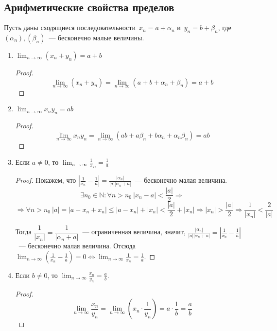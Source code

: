 \subsection{Арифметические свойства пределов}
Пусть даны сходящиеся последовательности~$x_n = a + \alpha_n$ и~$y_n = b + \beta_n$, где $(\alpha_n), (\beta_n)$~--- бесконечно малые величины.
\begin{enumerate}
	\item $\displaystyle \lim_{n \to \infty} (x_n + y_n) = a + b$
	\begin{proof}
	\begin{equation*}
	\lim_{n \to \infty} (x_n + y_n) = \lim_{n \to \infty} (a + b + \alpha_n + \beta_n) = a + b
	\end{equation*}
	\end{proof}
	
	\item $\displaystyle \lim_{n \to \infty} x_n y_n = ab$
	\begin{proof}
	\begin{equation*}
	\lim_{n \to \infty} x_n y_n = \lim_{n \to \infty} (ab + a\beta_n + b\alpha_n + \alpha_n \beta_n) = ab
	\end{equation*}
	\end{proof}
	
	\item Если $a \neq 0$, то $\displaystyle \lim_{n \to \infty} \frac1x_n = \frac1a$
	\begin{proof}
	Покажем, что $\displaystyle \left| \frac1{x_n} - \frac1a \right| = \frac{|\alpha_n|}{|a||\alpha_n + a|}$~--- бесконечно малая величина.
	\begin{equation*}
	\exists n_0 \in \mathbb N \colon \forall n > n_0 \ |x_n - a| < \frac{|a|}2 \Rightarrow
	\end{equation*}
	\begin{equation*}
	\Rightarrow \forall n > n_0 \ |a| = |a - x_n + x_n| \leqslant |a - x_n| + |x_n| < \frac{|a|}2 + |x_n| \Rightarrow |x_n| > \frac{|a|}2 \Rightarrow \frac1{|x_n|} < \frac2{|a|}
	\end{equation*}
	
	Тогда $\dfrac1{|x_n|} = \dfrac1{|\alpha_n + a|}$~--- ограниченная величина, значит,
	$\displaystyle \frac{|\alpha_n|}{|a||\alpha_n + a|} = \left| \frac1{x_n} - \frac1a \right|$~--- бесконечно малая величина.
	Отсюда $\displaystyle \lim_{n \to \infty} \left( \frac1{x_n} - \frac1a \right) = 0 \Leftrightarrow \lim_{n \to \infty} \frac1{x_n} = \frac1a$.
	\end{proof}
	
	\item Если $b \neq 0$, то $\displaystyle \lim_{n \to \infty} \frac{x_n}{y_n} = \frac{a}b$.
	\begin{proof}
	\begin{equation*}
	\lim_{n \to \infty} \frac{x_n}{y_n} =
	\lim_{n \to \infty} \left( x_n \cdot \frac1{y_n} \right) =
	a \cdot \frac1b = \frac{a}b
	\end{equation*}
	\end{proof}
\end{enumerate}
